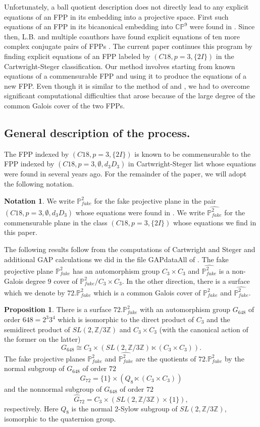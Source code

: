 \documentclass[11pt,reqno]{amsart}
\def\C {{\mathbb C}}
\def\Z {{\mathbb Z}}
\def\P {{\mathbb P}}
\def\FPP {{\P^2_{fake}}}
\theoremstyle{definition}
\newtheorem{proposition}[theorem]{Proposition}
\newtheorem{notation}[theorem]{Notation}
\numberwithin{equation}{section}
\begin{document}
\medskip 
Unfortunately, a ball quotient description does not directly lead to any explicit equations of an FPP in its embedding into a projective space.
First such equations of an FPP in its bicanonical embedding into $\C\P^9$ were found in \cite{B-Keum}. Since then, L.B. and multiple coauthors have found explicit equations of ten more complex conjugate pairs of FPPs \cite{B21,BBF,BF,BJL}. The current paper continues this program by finding explicit equations of an FPP labeled by $(C18,p=3,\{2I\})$ in the Cartwright-Steger classification.  Our method involves starting from known equations of a commensurable FPP and using it to produce the equations of a new FPP. Even though it is similar to the method of \cite{BF} and \cite{BJL}, we had to overcome significant computational difficulties that arose because of the large degree of the common Galois cover of the two FPPs.

\subsection{General description of the process.}
The FPP indexed by $(C18,p=3,\{2I\})$ is known to be commensurable to the FPP indexed by 
$(C18,p=3,\emptyset,d_3 D_3)$ in Cartwright-Steger list whose equations were found in \cite{BBF} several years ago.
For the remainder of the paper, we will adopt the following notation.

\begin{notation}
We write $\FPP$ for the fake projective plane in the pair $(C18,p=3,\emptyset,d_3 D_3)$ whose equations were found in \cite{BBF}.
We write  $\widehat\FPP$ for the commensurable plane in the class $(C18,p=3,\{2I\})$ whose equations we find in this paper.
\end{notation}

The following results follow from the computations of Cartwright and Steger and additional GAP \cite{GAP}  calculations we did in the file GAPdataAll of \cite{BW+}.
The fake projective plane  $\FPP$ has an automorphism group $C_3\times C_3$ and $\widehat\FPP$ is a non-Galois degree $9$ cover of 
$\FPP/C_3\times C_3$. In the other direction, there is a surface which we denote by $72.\FPP$ which is a common Galois cover of $\FPP$ and $\widehat\FPP$.

\begin{proposition}
There is a surface $72.\FPP$ with an automorphism group $G_{648}$ of order $648 = 2^3 3^4$ which is isomorphic to the direct product of 
$C_3$ and the semidirect product of $SL(2,\Z/3\Z)$ and $C_3\times C_3$ (with the canonical action of the former on the latter)
$$
G_{648} \cong  C_3 \times \left( SL(2,\Z/3\Z) \ltimes (C_3\times C_3)\right).
$$
The fake projective planes $\FPP$ and 
 $\widehat\FPP$ are the quotients of $72.\FPP$ by the normal subgroup of  $G_{648}$ of order $72$
$$
G_{72}=\{1\}\times  \left( Q_8 \ltimes (C_3\times C_3)\right)
$$
and the nonnormal subgroup of  $G_{648}$ of order $72$
$$
 \widehat G_{72}=C_3\times  \left( SL(2,\Z/3\Z)  \times \{1\} \right),
$$
respectively.
Here $Q_8$ is the normal 2-Sylow subgroup of $SL(2,\Z/3\Z)$, isomorphic to the quaternion group.
\end{proposition}
\end{document}
